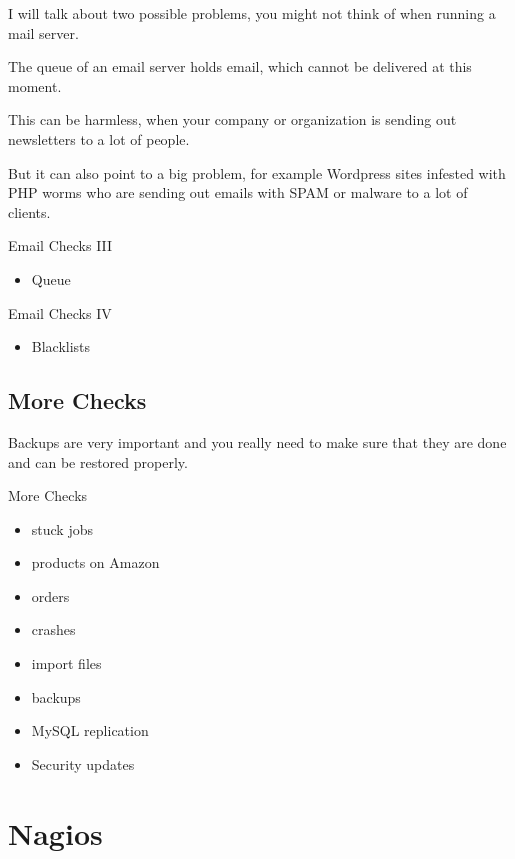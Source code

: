 I will talk about two possible problems,
you might not think of when running a mail server.

The queue of an email server holds email, which
cannot be delivered at this moment.

This can be harmless, when your company or organization
is sending out newsletters to a lot of people.

But it can also point to a big problem, for example
Wordpress sites infested with PHP worms who are
sending out emails with SPAM or malware to a lot
of clients.

\begin{frame}{Email Checks III}
\begin{itemize}
\item Queue
\end{itemize}
\end{frame}

\begin{frame}{Email Checks IV}
\begin{itemize}
\item Blacklists
\end{itemize}
\end{frame}

\subsection{More Checks}

Backups are very important and you really need to make sure
that they are done and can be restored properly.

\begin{frame}[fragile]{More Checks}

\begin{itemize}
\item stuck jobs
\item products on Amazon
\item orders
\item crashes
\item import files
\item backups
\item MySQL replication
\item Security updates
\end{itemize}
\end{frame}

\section{Nagios}

